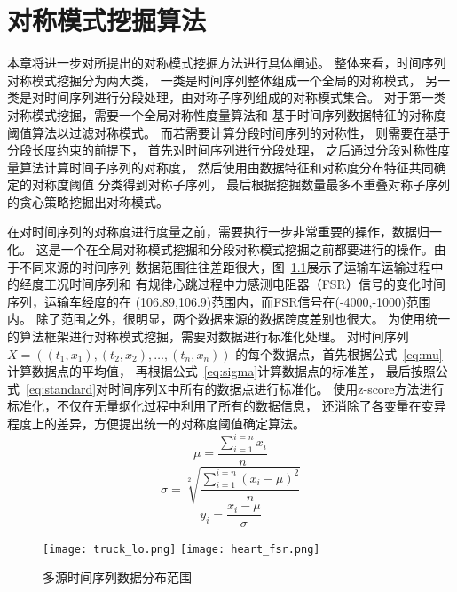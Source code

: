 
\chapter{对称模式挖掘算法}

本章将进一步对所提出的对称模式挖掘方法进行具体阐述。
整体来看，时间序列对称模式挖掘分为两大类，
一类是时间序列整体组成一个全局的对称模式，
另一类是对时间序列进行分段处理，由对称子序列组成的对称模式集合。
对于第一类对称模式挖掘，需要一个全局对称性度量算法和
基于时间序列数据特征的对称度阈值算法以过滤对称模式。
而若需要计算分段时间序列的对称性，
则需要在基于分段长度约束的前提下，
首先对时间序列进行分段处理，
之后通过分段对称性度量算法计算时间子序列的对称度，
然后使用由数据特征和对称度分布特征共同确定的对称度阈值
分类得到对称子序列，
最后根据挖掘数量最多不重叠对称子序列的贪心策略挖掘出对称模式。

在对时间序列的对称度进行度量之前，需要执行一步非常重要的操作，数据归一化。
这是一个在全局对称模式挖掘和分段对称模式挖掘之前都要进行的操作。由于不同来源的时间序列
数据范围往往差距很大，图~\ref{fig:data_range}展示了运输车运输过程中的经度工况时间序列和
有规律心跳过程中力感测电阻器（FSR）信号的变化时间序列，运输车经度的在
(106.89,106.9)范围内，而FSR信号在(-4000,-1000)范围内。
除了范围之外，很明显，两个数据来源的数据跨度差别也很大。
为使用统一的算法框架进行对称模式挖掘，需要对数据进行标准化处理。
对时间序列$X=\left(\left(t_{1}, x_{1}\right),\left(t_{2}, x_{2}\right), \ldots,\left(t_{n}, x_{n}\right)\right)$
的每个数据点，首先根据公式~\ref{eq:mu}计算数据点的平均值，
再根据公式~\ref{eq:sigma}计算数据点的标准差，
最后按照公式~\ref{eq:standard}对时间序列X中所有的数据点进行标准化。
使用z-score方法进行标准化，不仅在无量纲化过程中利用了所有的数据信息，
还消除了各变量在变异程度上的差异，方便提出统一的对称度阈值确定算法。
\begin{equation}
  \mu=\frac{\sum_{i=1}^{i=n} x_{i}}{n}
  \label{eq:mu}
\end{equation}
\begin{equation}
  \sigma=\sqrt[2]{\frac{\sum_{i=1}^{i=n}\left(x_{i}-\mu\right)^{2}}{n}}
  \label{eq:sigma}
\end{equation}
\begin{equation}
  y_{i}=\frac{x_{i}-\mu}{\sigma}
  \label{eq:standard}
\end{equation}
\begin{figure}
  \centering
  {\texttt{[image: truck\_lo.png]}}
  {\texttt{[image: heart\_fsr.png]}}
  \caption{多源时间序列数据分布范围}
  \label{fig:data_range}
\end{figure}

